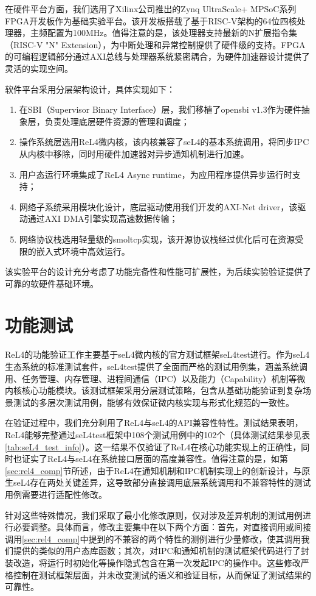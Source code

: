 在硬件平台方面，我们选用了Xilinx公司推出的Zynq UltraScale+ MPSoC系列FPGA开发板作为基础实验平台。该开发板搭载了基于RISC-V架构的64位四核处理器，主频配置为100MHz。值得注意的是，该处理器支持最新的N扩展指令集（RISC-V "N" Extension），为中断处理和异常控制提供了硬件级的支持。FPGA的可编程逻辑部分通过AXI总线与处理器系统紧密耦合，为硬件加速器设计提供了灵活的实现空间。

软件平台采用分层架构设计，具体实现如下：
\begin{enumerate}
    \item 在SBI（Supervisor Binary Interface）层，我们移植了opensbi v1.3作为硬件抽象层，负责处理底层硬件资源的管理和调度；
    \item 操作系统层选用ReL4微内核，该内核兼容了seL4的基本系统调用，将同步IPC从内核中移除，同时用硬件加速器对异步通知机制进行加速。
    \item 用户态运行环境集成了ReL4 Async runtime，为应用程序提供异步运行时支持；
    \item 网络子系统采用模块化设计，底层驱动使用我们开发的AXI-Net driver，该驱动通过AXI DMA引擎实现高速数据传输；
    \item 网络协议栈选用轻量级的smoltcp实现，该开源协议栈经过优化后可在资源受限的嵌入式环境中高效运行。
\end{enumerate}

该实验平台的设计充分考虑了功能完备性和性能可扩展性，为后续实验验证提供了可靠的软硬件基础环境。
\section{功能测试}
ReL4的功能验证工作主要基于seL4微内核的官方测试框架seL4test进行。作为seL4生态系统的标准测试套件，seL4test提供了全面而严格的测试用例集，涵盖系统调用、任务管理、内存管理、进程间通信（IPC）以及能力（Capability）机制等微内核核心功能模块。该测试框架采用分层测试策略，包含从基础功能验证到复杂场景测试的多层次测试用例，能够有效保证微内核实现与形式化规范的一致性。

在验证过程中，我们充分利用了ReL4与seL4的API兼容性特性。测试结果表明，ReL4能够完整通过seL4test框架中108个测试用例中的102个（具体测试结果参见表\ref{tab:seL4_test_info}）。这一结果不仅验证了ReL4在核心功能实现上的正确性，同时也证实了ReL4与seL4在系统接口层面的高度兼容性。值得注意的是，如第\ref{sec:rel4_comp}节所述，由于ReL4在通知机制和IPC机制实现上的创新设计，与原生seL4存在两处关键差异，这导致部分直接调用底层系统调用和不兼容特性的测试用例需要进行适配性修改。

针对这些特殊情况，我们采取了最小化修改原则，仅对涉及差异机制的测试用例进行必要调整。具体而言，修改主要集中在以下两个方面：首先，对直接调用或间接调用\ref{sec:rel4_comp}中提到的不兼容的两个特性的测例进行少量修改，使其调用我们提供的类似的用户态库函数；其次，对IPC和通知机制的测试框架代码进行了封装改造，将运行时初始化等操作隐式包含在第一次发起IPC的操作中。这些修改严格控制在测试框架层面，并未改变测试的语义和验证目标，从而保证了测试结果的可靠性。

